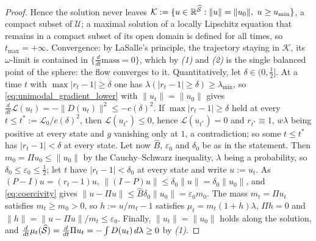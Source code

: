 \begin{proof}
Hence the solution never leaves $\mathcal K:=\{u\in\mathbb R^{\widehat{\mathcal S}}:\|u\|=\|u_0\|,\ u\geq u_{\min}\}$, a compact subset of $\mathcal U$; a maximal solution of a locally Lipschitz equation that remains in a compact subset of its open domain is defined for all times, so $t_{\max}=+\infty$. Convergence: by LaSalle's principle, the trajectory staying in $\mathcal K$, its $\omega$-limit is contained in $\{\frac d{dt}\mathrm{mass}=0\}$, which by \emph{(1)} and \emph{(2)} is the single balanced point of the sphere: the flow converges to it. Quantitatively, let $\delta\in(0,\frac12]$. At a time $t$ with $\max|r_t-1|\geq\delta$ one has $\lambda(|r_t-1|\geq\delta)\geq\lambda_{\min}$, so \eqref{eq:unimodal_gradient_lower} with $\|u_t\|=\|u_0\|$ gives $\frac{d}{dt}\mathcal L(u_t)=-\|D(u_t)\|^2\leq-c(\delta)^2$. If $\max|r_t-1|\geq\delta$ held at every $t\leq t^*:=\mathcal L_0/c(\delta)^2$, then $\mathcal L(u_{t^*})\leq0$, hence $\mathcal L(u_{t^*})=0$ and $r_{t^*}\equiv1$, $w\lambda$ being positive at every state and $g$ vanishing only at $1$, a contradiction; so some $t\leq t^*$ has $|r_t-1|<\delta$ at every state. Let now $\widehat B$, $\varepsilon_0$ and $\delta_0$ be as in the statement. Then $m_0=\Pi u_0\leq\|u_0\|$ by the Cauchy--Schwarz inequality, $\lambda$ being a probability, so $\delta_0\leq\varepsilon_0\leq\frac12$; let $t$ have $|r_t-1|<\delta_0$ at every state and write $u:=u_t$. As $(P-I)u=(r_t-1)u$, $\|(I-P)u\|\leq\delta_0\|u\|=\delta_0\|u_0\|$, and \eqref{eq:coercivity} gives $\|u-\Pi u\|\leq\widehat B\delta_0\|u_0\|=\varepsilon_0m_0$. The mass $m_t=\Pi u_t$ satisfies $m_t\geq m_0>0$, so $h:=u/m_t-1$ satisfies $\mu_t=m_t(1+h)\lambda$, $\Pi h=0$ and $\|h\|=\|u-\Pi u\|/m_t\leq\varepsilon_0$. Finally, $\|u_t\|=\|u_0\|$ holds along the solution, and $\frac d{dt}\mu_t(\widehat{\mathcal S})=\frac d{dt}\Pi u_t=-\int D(u_t)\,d\lambda\geq0$ by \emph{(1)}.
\end{proof}


